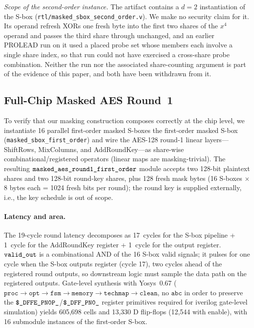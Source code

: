 \documentclass[journal,onecolumn]{IEEEtran}
\begin{document}
\textit{Scope of the second-order instance.}  The artifact contains a
$d{=}2$ instantiation of the S-box
(\texttt{rtl/masked\_sbox\_second\_order.v}).  We make no security claim
for it.  Its operand refresh XORs one fresh byte into the first two shares
of the $x^4$ operand and passes the third share through unchanged, and an
earlier PROLEAD run on it used a placed probe set whose members each
involve a single share index, so that run could not have exercised a
cross-share probe combination.  Neither the run nor the associated
share-counting argument is part of the evidence of this paper, and both
have been withdrawn from it.



\subsection{Full-Chip Masked AES Round~1}
\label{sec:fullchip}

To verify that our masking construction composes correctly at the
chip level, we instantiate 16 parallel first-order masked S-boxes
the first-order masked S-box (\texttt{masked\_sbox\_first\_order}) and wire the
AES-128 round-1 linear layers---ShiftRows, MixColumns, and
AddRoundKey---as share-wise combinational/registered operators
(linear maps are masking-trivial).  The resulting
$\texttt{masked\_\allowbreak{}aes\_\allowbreak{}round1\_\allowbreak{}first\_\allowbreak{}order}$ module accepts
two 128-bit plaintext shares and two 128-bit round-key shares,
plus 128 fresh mask bytes (16 S-boxes $\times$ 8 bytes each =
1024 fresh bits per round); the round key is supplied externally,
i.e., the key schedule is out of scope.

\paragraph{Latency and area.}
The 19-cycle round latency decomposes as 17~cycles for the
S-box pipeline + 1~cycle for the AddRoundKey register +
1~cycle for the output register.  $\texttt{valid\_\allowbreak{}out}$ is a
combinational AND of the 16 S-box valid signals; it pulses for one
cycle when the S-box outputs register (cycle 17), two cycles ahead
of the registered round outputs, so downstream logic must sample
the data path on the registered outputs.  Gate-level
synthesis with Yosys~0.67 ($\texttt{proc} \to \texttt{opt}
\to \texttt{fsm} \to \texttt{memory} \to
\texttt{techmap} \to \texttt{clean}$, no $\texttt{abc}$ in order
to preserve the $\texttt{\$\_\allowbreak{}DFFE\_\allowbreak{}PN0P\_\allowbreak}$/$\texttt{\$\_\allowbreak{}DFF\_\allowbreak{}PN0\_\allowbreak}$
register primitives required for iverilog gate-level
simulation) yields 605{,}698 cells and 13{,}330 D flip-flops
(12{,}544 with enable), with
16 submodule instances of the first-order S-box.
\end{document}
